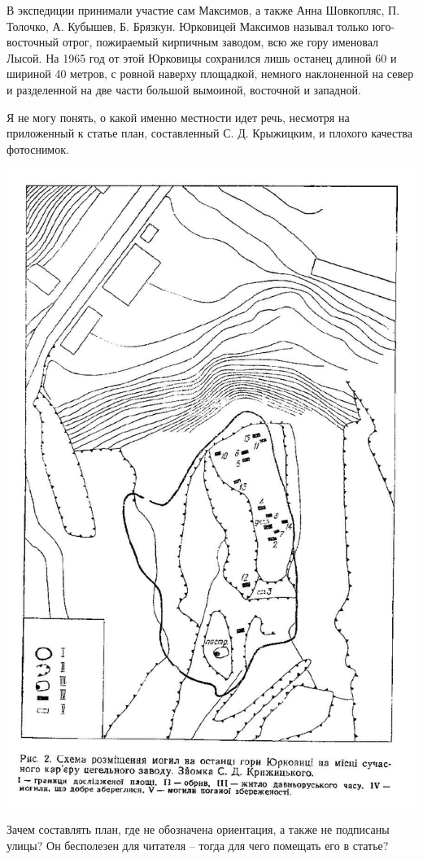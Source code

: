 В экспедиции принимали участие сам Максимов, а также Анна Шовкопляс, П. Толочко, А. Кубышев, Б. Брязкун. Юрковицей Максимов называл только юго-восточ\-ный отрог, пожираемый кирпичным заводом, всю же гору именовал Лысой. На 1965 год от этой Юрковицы сохранился лишь останец длиной 60 и шириной 40 метров, с ровной наверху площадкой, немного наклоненной на север и разделенной на две части большой вымоиной, восточной и западной.

Я не могу понять, о какой именно местности идет речь, несмотря на приложенный к статье план, составленный С. Д. Крыжицким, и плохого качества фотоснимок.

\begin{center}
\includegraphics[width=0.92\linewidth]{chast-kirvys/lys02/maxplan2.jpg}
\end{center}

Зачем составлять план, где не обозначена  ориентация, а также не подписаны улицы? Он бесполезен для читателя – тогда для чего помещать его в статье?

